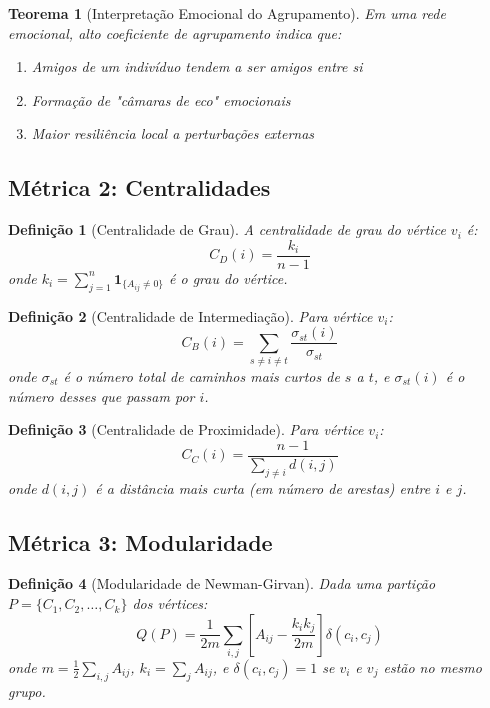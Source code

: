 \documentclass[12pt, a4paper]{article}
\newtheorem{definition}{Definição}
\newtheorem{theorem}{Teorema}
\begin{document}
\begin{theorem}[Interpretação Emocional do Agrupamento]
Em uma rede emocional, alto coeficiente de agrupamento indica que:
\begin{enumerate}
\item Amigos de um indivíduo tendem a ser amigos entre si
\item Formação de "câmaras de eco" emocionais
\item Maior resiliência local a perturbações externas
\end{enumerate}
\end{theorem}

\subsection{Métrica 2: Centralidades}

\begin{definition}[Centralidade de Grau]
A centralidade de grau do vértice $v_i$ é:
\[
C_D(i) = \frac{k_i}{n-1}
\]
onde $k_i = \sum_{j=1}^n \mathbf{1}_{\{A_{ij} \neq 0\}}$ é o grau do vértice.
\end{definition}

\begin{definition}[Centralidade de Intermediação]
Para vértice $v_i$:
\[
C_B(i) = \sum_{s \neq i \neq t} \frac{\sigma_{st}(i)}{\sigma_{st}}
\]
onde $\sigma_{st}$ é o número total de caminhos mais curtos de $s$ a $t$, e $\sigma_{st}(i)$ é o número desses que passam por $i$.
\end{definition}

\begin{definition}[Centralidade de Proximidade]
Para vértice $v_i$:
\[
C_C(i) = \frac{n-1}{\sum_{j \neq i} d(i,j)}
\]
onde $d(i,j)$ é a distância mais curta (em número de arestas) entre $i$ e $j$.
\end{definition}

\subsection{Métrica 3: Modularidade}

\begin{definition}[Modularidade de Newman-Girvan]
Dada uma partição $P = \{C_1, C_2, \dots, C_k\}$ dos vértices:
\[
Q(P) = \frac{1}{2m} \sum_{i,j} \left[ A_{ij} - \frac{k_i k_j}{2m} \right] \delta(c_i, c_j)
\]
onde $m = \frac{1}{2} \sum_{i,j} A_{ij}$, $k_i = \sum_j A_{ij}$, e $\delta(c_i, c_j) = 1$ se $v_i$ e $v_j$ estão no mesmo grupo.
\end{definition}
\end{document}
